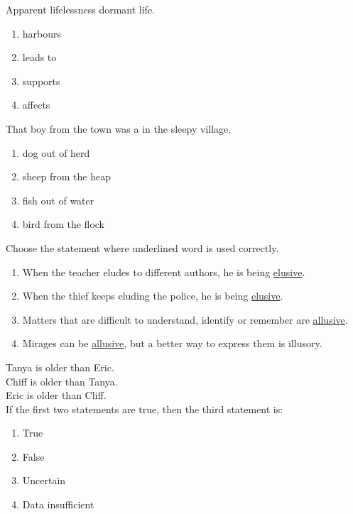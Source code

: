 \iffalse
  \title{CONIC SECTIONS}
  \author{ee24btech11031}
  \section{ph}
  \chapter{2015}
\fi
    \item Apparent lifelessness \underline{\phantom{black}} dormant life.
    \begin{enumerate}
        \item harbours
        \item leads to
        \item supports
        \item affects
    \end{enumerate}
    \item That boy from the town was a \underline{\phantom{black}} in the sleepy village.
    \begin{enumerate}
    \item dog out of herd
    \item sheep from the heap
    \item fish out of water
    \item bird from the flock
    \end{enumerate}
    \item Choose the statement where underlined word is used correctly.
    \begin{enumerate}
        \item When the teacher eludes to different authors, he is being \underline{elusive}.
        \item When the thief keeps eluding the police, he is being \underline{elusive}.
        \item Matters that are difficult to understand, identify or remember are \underline{allusive}.
        \item Mirages can be \underline{allusive}, but a better way to express them is illusory.
    \end{enumerate}
    \item Tanya is older than Eric.\\Chiff is older than Tanya.\\Eric is older than Cliff.\\
	    \hfill{If the first two statements are true, then the third statement is:}
    \begin{enumerate}
        \item True
        \item False
        \item Uncertain
        \item Data insufficient
    \end{enumerate}
